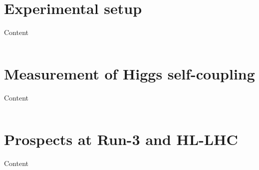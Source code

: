 \documentclass[10pt,aspectratio=169]{beamer}
\begin{document}
\section{Experimental setup}

\begin{frame}{Content}
\label{content}
    \begin{columns}[t]
        \begin{column}{.5\textwidth}
            \tableofcontents[sections={1-5},currentsection]
        \end{column}
        \begin{column}{.5\textwidth}
            \tableofcontents[sections={6-},currentsection]
        \end{column}
    \end{columns}
\end{frame}



\section{Measurement of Higgs self-coupling}

\begin{frame}{Content}
\label{content}
    \begin{columns}[t]
        \begin{column}{.5\textwidth}
            \tableofcontents[sections={1-5},currentsection]
        \end{column}
        \begin{column}{.5\textwidth}
            \tableofcontents[sections={6-},currentsection]
        \end{column}
    \end{columns}
\end{frame}



\section{Prospects at Run-3 and HL-LHC}

\begin{frame}{Content}
\label{content}
    \begin{columns}[t]
        \begin{column}{.5\textwidth}
            \tableofcontents[sections={1-5},currentsection]
        \end{column}
        \begin{column}{.5\textwidth}
            \tableofcontents[sections={6-},currentsection]
        \end{column}
    \end{columns}
\end{frame}
\end{document}
